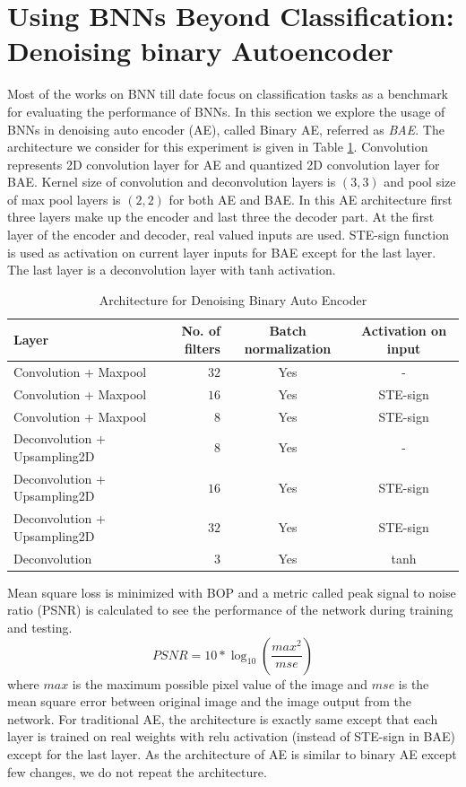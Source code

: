 \section{Using BNNs Beyond Classification: Denoising binary Autoencoder}
Most of the works on BNN till date focus on classification tasks as a benchmark for evaluating the performance of BNNs. In this section we explore the usage of BNNs in  denoising auto encoder (AE), called Binary AE, referred as \textit{BAE}. The architecture we consider for this experiment is given in Table \ref{BAE}. Convolution represents 2D convolution layer for AE and quantized 2D convolution layer for BAE. Kernel size of convolution and deconvolution layers is $(3,3)$ and pool size of max pool layers is $(2,2)$ for both AE and BAE. In this AE architecture first three layers make up the encoder and last three the decoder part. At the first layer of the encoder and decoder, real valued inputs are used. STE-sign function is used as activation on current layer inputs for BAE except for the last layer. The last layer is a deconvolution layer with tanh activation. 
\begin{table}[ht]
  \caption{Architecture for Denoising Binary Auto Encoder}
  \label{BAE}
  \centering
  \begin{tabular}{lrcc}
    \hline
    Layer  &  No. of filters & Batch normalization & Activation on input\\
    \midrule
    Convolution + Maxpool &  $32$  & Yes & -  \\
    Convolution + Maxpool &  $16$  & Yes & STE-sign \\
    Convolution + Maxpool &  $8$  & Yes  & STE-sign \\
    Deconvolution + Upsampling2D &  $8$  & Yes  & - \\
    Deconvolution + Upsampling2D &  $16$  & Yes  & STE-sign \\
    Deconvolution + Upsampling2D &  $32$  & Yes  & STE-sign \\
    Deconvolution &  $3$  & Yes & tanh \\
    \bottomrule
  \end{tabular}
\end{table}
Mean square loss is minimized with BOP and a metric called peak signal to noise ratio (PSNR) is calculated to see the performance of the network during training and testing.
\begin{equation}
    PSNR = 10*\log_{10}\left(\frac{max^2}{mse}\right)
\end{equation}
where $max$ is the maximum possible pixel value of the image and $mse$ is the mean square error between original image and the image output from the network. For traditional AE, the architecture is exactly same except that each layer is trained on real weights with relu activation (instead of STE-sign in BAE) except for the last layer. As the architecture of AE is similar to binary AE except few changes, we do not repeat the architecture.
